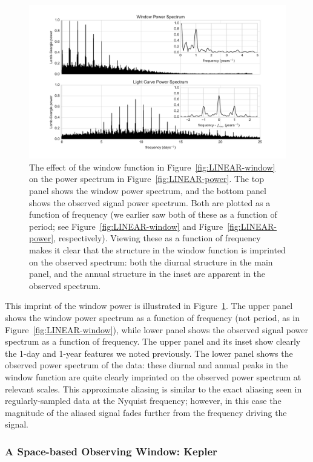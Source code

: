 \documentclass[preprint]{aastex}
\newcommand{\fig}[1]{Figure~\ref{fig:#1}}
\newcommand{\figlabel}[1]{\label{fig:#1}}
\begin{document}
\begin{figure}[ht]
  \centering
  \includegraphics[width=\textwidth]{fig15_LINEAR_window_effect}
  \caption{The effect of the window function in \fig{LINEAR-window} on the
    power spectrum in \fig{LINEAR-power}.
    The top panel shows the window power spectrum, and the bottom panel shows
    the observed signal power spectrum.
    Both are plotted as a function of frequency (we earlier saw both of these
    as a function of period; see \fig{LINEAR-window} and \fig{LINEAR-power},
    respectively).
    Viewing these as a function of frequency makes it clear that the structure
    in the window function is imprinted on the observed spectrum: both the
    diurnal structure in the main panel, and the annual structure in the inset
    are apparent in the observed spectrum.
    \figlabel{LINEAR-window-effect}}
\end{figure}

This imprint of the window power is illustrated in \fig{LINEAR-window-effect}.
The upper panel shows the window power spectrum as a function of frequency
(not period, as in \fig{LINEAR-window}), while lower panel shows the observed
signal power spectrum as a function of frequency.
The upper panel and its inset show clearly the 1-day and 1-year features we
noted previously.
The lower panel shows the observed power spectrum of the data: these diurnal
and annual peaks in the window function are quite clearly imprinted on the
observed power spectrum at relevant scales.
This approximate aliasing is similar to the exact aliasing seen in
regularly-sampled data at the Nyquist frequency; however, in this case
the magnitude of the aliased signal fades further from the frequency
driving the signal.


\subsubsection{A Space-based Observing Window: Kepler}
\end{document}
